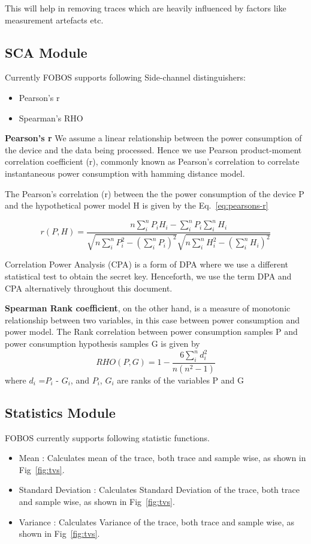 This will help in removing traces which are heavily influenced by factors like measurement artefacts etc.

\subsection{SCA Module}
Currently FOBOS supports following Side-channel distinguishers:
\begin{itemize}
\item Pearson's r
\item Spearman's RHO
\end{itemize}
\textbf{Pearson's r}
We assume a linear relationship between the power consumption of the device
and the data being processed. Hence we use Pearson product-moment correlation
coefficient (r), commonly known as Pearson's correlation to correlate instantaneous power
consumption with hamming distance model.

The Pearson's correlation (r) between the the power consumption of the device P and the
hypothetical power model H is given by the Eq.~\ref{eq:pearsons-r}

\begin{equation}\label{eq:pearsons-r}
r(P,H) =\frac{n \sum_{i}^{n}{P_iH_i}-\sum_{i}^{n} P_i\sum_{i}^{n}H_i}{\sqrt{n\sum_{i}^{n} 
	      P_i^2-(\sum_{i}^{n} P_i)^2}\sqrt {n\sum_{i}^{n} H_i^2-(\sum_{i}^{n} H_i)^2}}
\end{equation}   

Correlation Power Analysis (CPA) is a form of DPA where we use a different statistical test to obtain the secret key. Henceforth, we use
the term DPA and CPA alternatively throughout this document.

\textbf{Spearman Rank coefficient}, on the other hand, is a measure of monotonic relationship 
between two variables, in this case between power consumption and power model.
The Rank correlation between power consumption samples P and power consumption hypothesis samples G is given by
\begin{equation}
\label{pceqn}
RHO(P,G)=1-\frac{6\sum_{i}^{n}d_i^2}{n(n^2-1)}
\end{equation} 
where $d_i$ =$P_i$ - $G_i$, and $P_i$, $G_i$ are ranks of the variables P and G 

\subsection{Statistics Module}
FOBOS currently supports following statistic functions.
\begin{itemize}
\item Mean : Calculates mean of the trace, both trace and sample wise, as shown in Fig~\ref{fig:tvs}.
\item Standard Deviation : Calculates Standard Deviation of the trace, both trace and sample wise, as shown in Fig~\ref{fig:tvs}.
\item Variance : Calculates Variance of the trace, both trace and sample wise, as shown in Fig~\ref{fig:tvs}.
\end{itemize}

